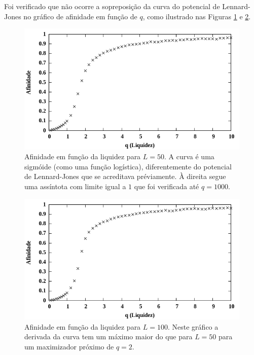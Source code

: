 \documentclass[12pt,a4paper,final]{article}
\begin{document}
  Foi verificado que não ocorre a sopreposição da curva do potencial de Lennard-Jones no gráfico de afinidade em função de $q$, como ilustrado nas Figuras \ref{fig:L50} e \ref{fig:L100}.

  \begin{figure}[h]
    \centering
    \includegraphics[width=.7\linewidth]{L50.png}
    \caption{Afinidade em função da liquidez para $L = 50$. A curva é uma sigmóide (como uma função logística), diferentemente do potencial de Lennard-Jones que se acreditava préviamente. À direita segue uma assíntota com limite igual a $1$ que foi verificada até $q=1000$.}
    \label{fig:L50}
  \end{figure}

  \begin{figure}[h]
    \centering
    \includegraphics[width=.7\linewidth]{L100.png}
    \caption{Afinidade em função da liquidez para $L = 100$. Neste gráfico a derivada da curva tem um máximo maior do que para $L = 50$ para um maximizador próximo de $q = 2$.}
    \label{fig:L100}
  \end{figure}
\end{document}
